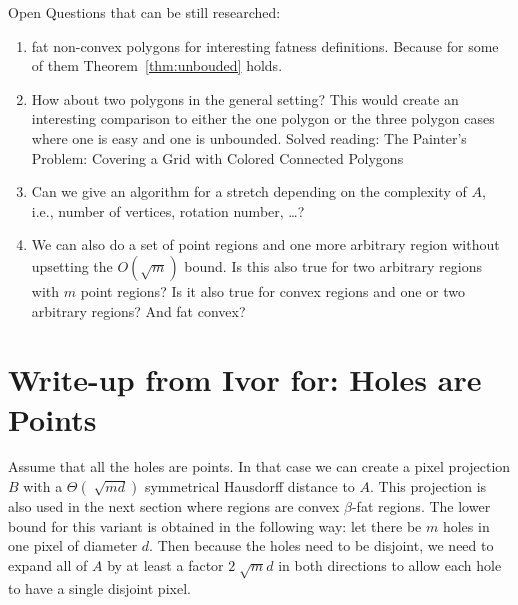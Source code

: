 \documentclass[a4paper,UKenglish,cleveref]{lipics-v2019}
\begin{document}
Open Questions that can be still researched:
\begin{enumerate}
	\item fat non-convex polygons for interesting fatness definitions. Because for some of them Theorem~\ref{thm:unbouded} holds.
	\item How about two polygons in the general setting? This would create an interesting comparison to either the one polygon or the three polygon cases where one is easy and one is unbounded.
	Solved reading: The Painter’s Problem: Covering a Grid with Colored Connected Polygons
	\item Can we give an algorithm for a stretch depending on the complexity of $A$, i.e., number of vertices, rotation number, \dots?
	\item We can also do a set of point regions and one more arbitrary region without upsetting the $O(\sqrt{m})$ bound. Is this also true for two arbitrary regions with $m$ point regions? Is it also true for convex regions and one or two arbitrary regions? And fat convex?
\end{enumerate}


\newpage
\appendix



\section{Write-up from Ivor for: Holes are Points}



Assume that all the holes are points. In that case we can create a pixel projection $B$ with a $\Theta(\sqrt[]{md})$ symmetrical Hausdorff distance to $A$. This projection is also used in the next section where regions are convex $\beta$-fat regions.  The lower bound for this variant is obtained in the following way: let there be $m$ holes in one pixel of diameter $d$. Then because the holes need to be disjoint, we need to expand all of $A$ by at least a factor $2\sqrt[]{m}d$ in both directions to allow each hole to have a single disjoint pixel.
\end{document}
